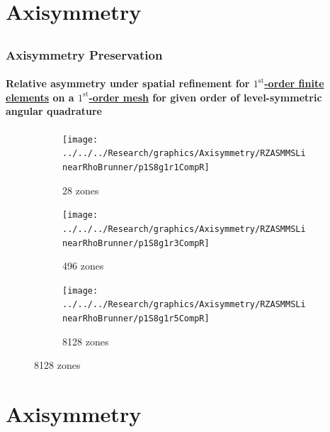 \documentclass[compress,t]{beamer}
\begin{document}
\section{Axisymmetry}
\subsection{}

\begin{frame}
\frametitle{Axisymmetry Preservation}
\framesubtitle{Relative asymmetry under spatial refinement for \underline{$1^\text{st}$-order finite elements} on a \underline{$1^\text{st}$-order mesh} for given order of level-symmetric angular quadrature}

\begin{figure}
\centering
\begin{subfigure}{0.33\textwidth}
\centering
\texttt{[image: ../../../Research/graphics/Axisymmetry/RZASMMSLinearRhoBrunner/p1S8g1r1CompR]}
\caption{28 zones}
\end{subfigure}%
\begin{subfigure}{0.33\textwidth}
\centering
\texttt{[image: ../../../Research/graphics/Axisymmetry/RZASMMSLinearRhoBrunner/p1S8g1r3CompR]}
\caption{496 zones}
\end{subfigure}%
\begin{subfigure}{0.33\textwidth}
\centering
\texttt{[image: ../../../Research/graphics/Axisymmetry/RZASMMSLinearRhoBrunner/p1S8g1r5CompR]}
\caption{8128 zones}
\end{subfigure}
\end{figure}

\end{frame}

\section{Axisymmetry}
\subsection{}
\end{document}

